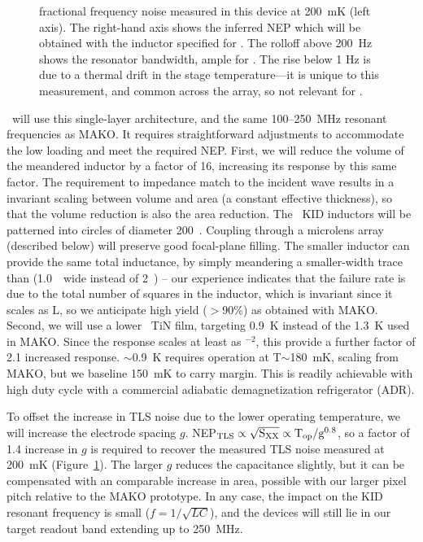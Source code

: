 \begin{figure}[t!]
\begin{center}
{fractional frequency noise measured in this device at 200~mK (left axis).  The right-hand axis shows the inferred NEP which will be obtained with the inductor specified for \icaris.  The rolloff above 200~Hz shows the resonator bandwidth, ample for \icaris. The rise below 1 Hz is due to a thermal drift in the stage temperature---it is unique to this measurement, and common across the array, so not relevant for \icaris. }
\linefig\vspace{-0.35in} \label{fig:makonew}
\end{center}
\end{figure}

\vspace{0.05in}{\bf Pixel design for \icaris.} \icaris\ will use this single-layer architecture, and the same 100--250~MHz resonant frequencies as MAKO.  It requires straightforward adjustments to accommodate the low loading and meet the required NEP.  First, we will reduce the volume of the meandered inductor by a factor of 16, increasing its response by this same factor.  The requirement to impedance match to the incident wave results in a invariant scaling between volume and area (a constant effective thickness), so that the volume reduction is also the area reduction.  The \icaris\ KID inductors will be patterned into circles of diameter 200~\mum.  Coupling through a microlens array (described below) will preserve good focal-plane filling.  The smaller inductor can provide the same total inductance, by simply meandering a smaller-width trace than (1.0~\mum\ wide instead of 2~\mum) -- our experience indicates that the failure rate is due to the total number of squares in the inductor, which is invariant 
since it scales as L, so we anticipate high yield ($>$90\%) as obtained with MAKO.  Second, we will use a lower \Tc\ TiN film, targeting 0.9~K instead of the 1.3~K used in MAKO.   Since the response scales at least as \Tc$^{-2}$, this provide a further factor of 2.1 increased response.  \Tc$\sim$0.9~K requires operation at T$\sim$180~mK, scaling from MAKO, but we baseline 150~mK to carry margin.  This is readily achievable with high duty cycle with a commercial adiabatic demagnetization refrigerator (ADR).   

To offset the increase in TLS noise due to the lower operating temperature, we will increase the electrode spacing $g$.  NEP$_{\rm TLS} \propto \sqrt{\rm S_{\rm XX}} \propto \rm T_{\rm op} / g^{0.8}$, so a factor of 1.4 increase in $g$ is required to recover the measured TLS noise measured at 200~mK (Figure~\ref{fig:makonew}).   The larger $g$ reduces the capacitance slightly, but it can be compensated with an comparable increase in area, possible with our larger pixel pitch relative to the MAKO prototype.  In any case, the impact on the KID resonant frequency is small ($f=1/\sqrt{LC}$), and the devices will still lie in our target readout band extending up to 250~MHz.

